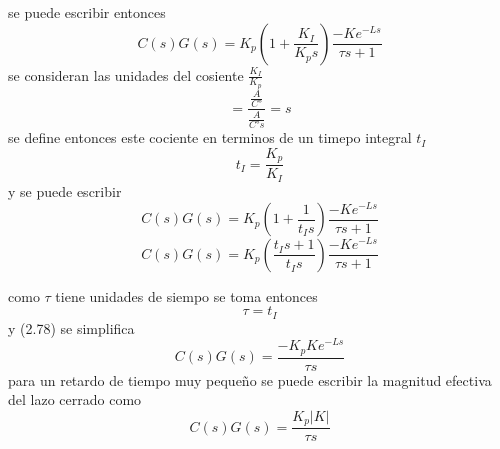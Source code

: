 se puede escribir entonces 
\begin{equation}
    C(s)G(s) = K_{p}(1+\frac{K_{I}}{K_{p}s})\frac{-Ke^{-Ls}}{\tau s +1}
\end{equation}
se consideran las unidades del cosiente $\frac{K_{I}}{K_{p}}$
\begin{equation}
    [\frac{K_{p}}{K_{I}}] = \frac{\frac{A}{C°}}{\frac{A}{C°s}} = s
\end{equation}
se define entonces este cociente en terminos de un timepo integral $t_{I}$
\begin{equation}
    t_{I} = \frac{K_{p}}{K_{I}}
\end{equation}
y se puede escribir 
\begin{equation}
    C(s)G(s)= K_{p}(1+\frac{1}{t_{I}s})\frac{-Ke^{-Ls}}{\tau s +1}
\end{equation}
\begin{equation}
 C(s)G(s)= K_{p}(\frac{t_{I}s+1}{t_{I}s})\frac{-Ke^{-Ls}}{\tau s +1}
\end{equation}

como $\tau$ tiene unidades de siempo se toma entonces
\begin{equation}
     \tau = t_{I}
\end{equation}
y (2.78) se simplifica 
\begin{equation}
    C(s)G(s) = \frac{-K_{p}Ke^{-Ls}}{\tau s}
\end{equation}
para un retardo de tiempo  muy pequeño se puede escribir la magnitud efectiva del lazo cerrado como
\begin{equation}
     C(s)G(s) = \frac{K_{p}|K|}{\tau s}
\end{equation}
